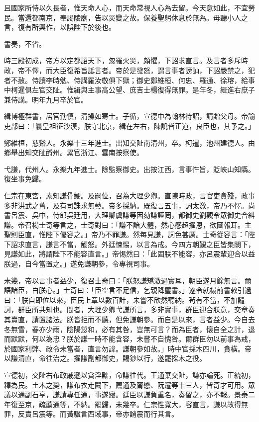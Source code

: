 \begin{pinyinscope}
且國家所恃以久長者，惟天命人心，而天命常視人心為去留。今天意如此，不宜勞民。當還都南京，奉謁陵廟，告以災變之故。保養聖躬休息於無為。毋聽小人之言，復有所興作，以誤陛下於後也。

書奏，不省。

時三殿初成，帝方以定都詔天下，忽罹火災，頗懼，下詔求直言。及言者多斥時政，帝不懌，而大臣復希旨詆言者。帝於是發怒，謂言事者謗訕，下詔嚴禁之，犯者不赦。侍讀李時勉、侍講羅汝敬俱下獄；御史鄭維桓、何忠、羅通、徐瑢，給事中柯暹俱左官交阯。惟緝與主事高公望、庶吉士楊復得無罪。是年冬，緝進右庶子兼侍講。明年九月卒於官。

緝博極群書，居官勤慎，清操如寒士。子循，宣德中為翰林待詔，請贈父母。帝諭吏部曰：「曩皇祖征沙漠，朕守北京，緝在左右，陳說皆正道，良臣也，其予之。」

鄭維桓，慈谿人。永樂十三年進士。出知交阯南清州，卒。柯暹，池州建德人。由鄉舉出知交阯酹州。累官浙江、雲南按察使。

弋謙，代州人。永樂九年進士。除監察御史。出按江西，言事忤旨，貶峽山知縣。復坐事免歸。

仁宗在東宮，素知謙骨鯁。及嗣位，召為大理少卿。直陳時政，言官吏貪殘，政事多非洪武之舊，及有司誅求無藝。帝多採納。既復言五事，詞太激，帝乃不懌。尚書呂震、吳中，侍郎吳廷用，大理卿虞謙等因劾謙誣罔，都御史劉觀令眾御史合糾謙。帝召楊士奇等言之，士奇對曰：「謙不諳大體，然心感超擢恩，欲圖報耳。主聖則臣直，惟陛下優容之。」帝乃不罪謙。然每見謙，詞色甚厲。士奇從容言：「陛下詔求直言，謙言不當，觸怒。外廷悚惕，以言為戒。今四方朝覲之臣皆集闕下，見謙如此，將謂陛下不能容直言。」帝惕然曰：「此固朕不能容，亦呂震輩迎合以益朕過，自今當置之。」遂免謙朝參，令專視司事。

未幾，帝以言事者益少，復召士奇曰：「朕怒謙矯激過實耳，朝臣遂月餘無言。爾語諸臣，白朕心。」士奇曰：「臣空言不足信，乞親降璽書。」遂令就榻前書敕引過曰：「朕自即位以來，臣民上章以數百計，未嘗不欣然聽納。茍有不當，不加譴訶，群臣所共知也。間者，大理少卿弋謙所言，多非實事，群臣迎合朕意，交章奏其賣直，請置諸法。朕皆拒而不聽，但免謙朝參。而自是以來，言者益少。今自去冬無雪，春亦少雨，陰陽愆和，必有其咎，豈無可言？而為臣者，懷自全之計，退而默默，何以為忠？朕於謙一時不能含容，未嘗不自愧咎。爾群臣勿以前事為戒，於國家利弊、政令未當者，直言勿諱。謙朝參如故。」時中官採木四川，貪橫。帝以謙清直，命往治之。擢謙副都御史，賜鈔以行，遂罷採木之役。

宣德初，交阯右布政戚遜以貪淫黜，命謙往代。王通棄交阯，謙亦論死。正統初，釋為民。土木之變，謙布衣走闕下，薦通及甯懋、阮遷等十三人，皆奇才可用。眾議以通副石亨，謙請專任通，事遂寢。廷臣以謙負重名，奏留之，亦不報。景泰二年復至京，疏薦通等，不納。罷歸，未幾卒。仁宗性寬大，容直言，謙以故得無罪，反責呂震等。而黃驥言西域事，帝亦誚震而行其言。


\end{pinyinscope}
